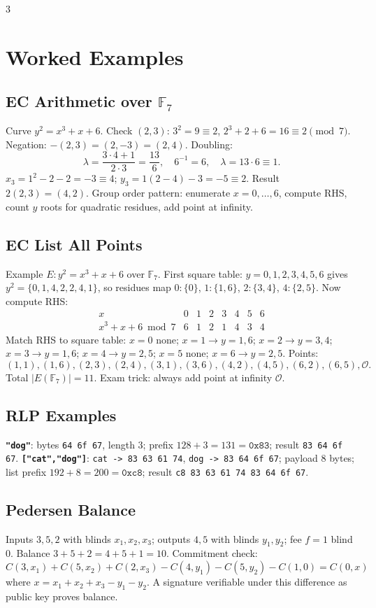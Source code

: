 \documentclass[8pt]{extarticle}
\newcommand{\term}[1]{\textbf{#1}}
\newcommand{\F}{\mathbb{F}}
\begin{document}
\begin{multicols*}{3}
\section{Worked Examples}
\subsection{EC Arithmetic over $\F_7$}
Curve $y^2=x^3+x+6$. Check $(2,3)$: $3^2=9\equiv2$, $2^3+2+6=16\equiv2\pmod7$. Negation: $-(2,3)=(2,-3)=(2,4)$. Doubling:
\[
\lambda=\frac{3\cdot4+1}{2\cdot3}=\frac{13}{6},\quad 6^{-1}=6,\quad \lambda=13\cdot6\equiv1.
\]
$x_3=1^2-2-2=-3\equiv4$; $y_3=1(2-4)-3=-5\equiv2$. Result $2(2,3)=(4,2)$. Group order pattern: enumerate $x=0,\ldots,6$, compute RHS, count $y$ roots for quadratic residues, add point at infinity.

\subsection{EC List All Points}
Example $E:y^2=x^3+x+6$ over $\F_7$. First square table: $y=0,1,2,3,4,5,6$ gives $y^2=\{0,1,4,2,2,4,1\}$, so residues map $0:\{0\}$, $1:\{1,6\}$, $2:\{3,4\}$, $4:\{2,5\}$. Now compute RHS:
\[
\begin{array}{c|ccccccc}
x&0&1&2&3&4&5&6\\
\hline
x^3+x+6\bmod7&6&1&2&1&4&3&4
\end{array}
\]
Match RHS to square table: $x=0$ none; $x=1\to y=1,6$; $x=2\to y=3,4$; $x=3\to y=1,6$; $x=4\to y=2,5$; $x=5$ none; $x=6\to y=2,5$. Points:
\[
(1,1),(1,6),(2,3),(2,4),(3,1),(3,6),(4,2),(4,5),(6,2),(6,5),\mathcal O.
\]
Total $|E(\F_7)|=11$. Exam trick: always add point at infinity $\mathcal O$.

\subsection{RLP Examples}
\term{\texttt{"dog"}}: bytes \texttt{64 6f 67}, length 3; prefix $128+3=131=\texttt{0x83}$; result \texttt{83 64 6f 67}. \term{\texttt{["cat","dog"]}}: \texttt{cat -> 83 63 61 74}, \texttt{dog -> 83 64 6f 67}; payload 8 bytes; list prefix $192+8=200=\texttt{0xc8}$; result \texttt{c8 83 63 61 74 83 64 6f 67}.

\subsection{Pedersen Balance}
Inputs $3,5,2$ with blinds $x_1,x_2,x_3$; outputs $4,5$ with blinds $y_1,y_2$; fee $f=1$ blind 0. Balance $3+5+2=4+5+1=10$. Commitment check:
\[
C(3,x_1)+C(5,x_2)+C(2,x_3)-C(4,y_1)-C(5,y_2)-C(1,0)=C(0,x)
\]
where $x=x_1+x_2+x_3-y_1-y_2$. A signature verifiable under this difference as public key proves balance.


\end{multicols*}
\end{document}
